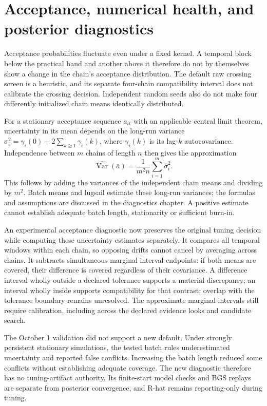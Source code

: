 \section[Acceptance and posterior diagnostics]{Acceptance, numerical health, and posterior diagnostics}

Acceptance probabilities fluctuate even under a fixed kernel. A temporal block
below the practical band and another above it therefore do not by themselves
show a change in the chain's acceptance distribution. The default raw crossing
screen is a heuristic, and its separate four-chain compatibility interval does
not calibrate the crossing decision. Independent random seeds also do not make
four differently initialized chain means identically distributed.

For a stationary acceptance sequence $a_{it}$ with an applicable central limit
theorem, uncertainty in its mean depends on the long-run variance
$\sigma_i^2=\gamma_i(0)+2\sum_{k\geq1}\gamma_i(k)$, where $\gamma_i(k)$ is
its lag-$k$ autocovariance. Independence between $m$ chains of length $n$
then gives the approximation
\[
 \widehat{\operatorname{Var}}(\bar a)
 = \frac{1}{m^2 n}\sum_{i=1}^{m}\widehat\sigma_i^2.
\]
This follows by adding the variances of the independent chain means and
dividing by $m^2$. Batch means and lugsail estimate these long-run variances;
the formulas and assumptions are discussed in the diagnostics chapter. A
positive estimate cannot establish adequate batch length, stationarity or
sufficient burn-in.

An experimental acceptance diagnostic now preserves the original tuning
decision while computing these uncertainty estimates separately. It compares
all temporal windows within each chain, so opposing drifts cannot cancel by
averaging across chains. It subtracts simultaneous marginal interval endpoints:
if both means are covered, their difference is covered regardless of their
covariance. A difference interval wholly outside a declared tolerance supports
a material discrepancy; an interval wholly inside supports compatibility for
that contrast; overlap with the tolerance boundary remains unresolved. The
approximate marginal intervals still require calibration, including across
the declared evidence looks and candidate search.

The October 1 validation did not support a new default. Under strongly
persistent stationary simulations, the tested batch rules underestimated
uncertainty and reported false conflicts. Increasing the batch length reduced
some conflicts without establishing adequate coverage. The new diagnostic
therefore has no tuning-artifact authority. Its finite-start model checks and
BGS replays are separate from posterior convergence, and R-hat remains
reporting-only during tuning.

